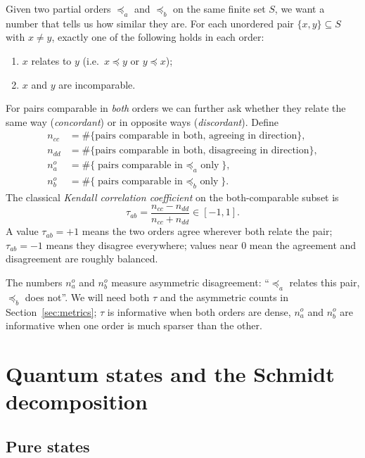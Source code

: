 \documentclass[11pt,a4paper]{article}
\theoremstyle{definition}
\theoremstyle{plain}
\theoremstyle{remark}
\begin{document}
Given two partial orders $\preceq_a$ and $\preceq_b$ on the same finite
set $S$, we want a number that tells us how similar they are.  For each
unordered pair $\{x, y\} \subseteq S$ with $x \ne y$, exactly one of the
following holds in each order:
\begin{enumerate}[label=(\alph*),nosep]
  \item $x$ relates to $y$ (i.e.\ $x \preceq y$ or $y \preceq x$);
  \item $x$ and $y$ are incomparable.
\end{enumerate}
For pairs comparable in \emph{both} orders we can further ask whether
they relate the same way (\emph{concordant}) or in opposite ways
(\emph{discordant}).  Define
\begin{align}
  n_{cc} &= \#\{ \text{pairs comparable in both, agreeing in direction} \},\\
  n_{dd} &= \#\{ \text{pairs comparable in both, disagreeing in direction} \},\\
  n_a^o &= \#\{ \text{pairs comparable in $\preceq_a$ only} \},\\
  n_b^o &= \#\{ \text{pairs comparable in $\preceq_b$ only} \}.
\end{align}
The classical \emph{Kendall correlation coefficient} on the
both-comparable subset is
\begin{equation}\label{eq:kendall}
  \tau_{ab} = \frac{n_{cc} - n_{dd}}{n_{cc} + n_{dd}}
            \in [-1, 1].
\end{equation}
A value $\tau_{ab} = +1$ means the two orders agree wherever both
relate the pair; $\tau_{ab} = -1$ means they disagree everywhere; values
near $0$ mean the agreement and disagreement are roughly balanced.

The numbers $n_a^o$ and $n_b^o$ measure asymmetric disagreement:
``$\preceq_a$ relates this pair, $\preceq_b$ does not''.  We will
need both $\tau$ and the asymmetric counts in
Section~\ref{sec:metrics}; $\tau$ is informative when both orders
are dense, $n_a^o$ and $n_b^o$ are informative when one order is
much sparser than the other.

\section{Quantum states and the Schmidt decomposition}\label{sec:quantum}

\subsection{Pure states}
\end{document}
